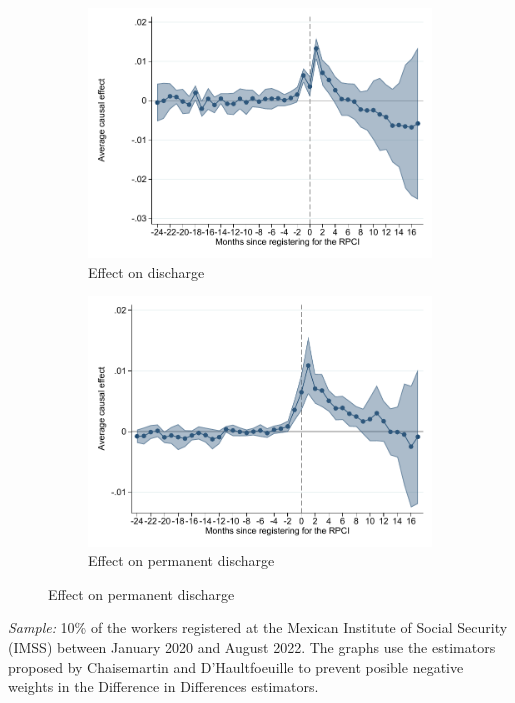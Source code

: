 \documentclass[oneside,11pt]{article}
\begin{document}
\begin{figure}[H]
\begin{center}
    \begin{subfigure}{0.49\textwidth}
    \caption{Effect on discharge}
    \includegraphics[width=\textwidth]{04_Figures/muestra_10porciento/event_study_baja_cierre_chaisemartin.pdf}
    \end{subfigure}
    \begin{subfigure}{0.49\textwidth}
    \caption{Effect on permanent discharge}
    \includegraphics[width=\textwidth]{04_Figures/muestra_10porciento/event_study_baja_permanente_chaisemartin.pdf}
    \end{subfigure}
    
    \end{center}
\end{figure}
\scriptsize{
\noindent \textit{Sample:} 10\% of the workers registered at the Mexican Institute of Social Security (IMSS) between January 2020 and August 2022. The graphs use the estimators proposed by Chaisemartin and D'Haultfoeuille to prevent posible negative weights in the Difference in Differences estimators.
}
\end{document}
